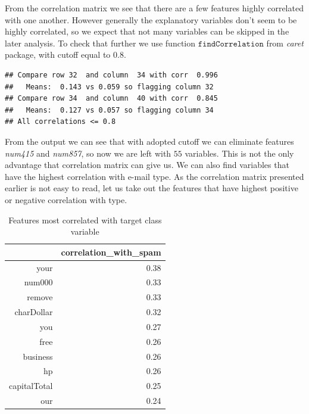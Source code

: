 \documentclass{article}\usepackage[]{graphicx}\usepackage[]{xcolor}
\makeatletter
\newenvironment{kframe}{%
 \def\at@end@of@kframe{}%
 \ifinner\ifhmode%
  \def\at@end@of@kframe{\end{minipage}}%
  \begin{minipage}{\columnwidth}%
 \fi\fi%
 \def\FrameCommand##1{\hskip\@totalleftmargin \hskip-\fboxsep
 \colorbox{shadecolor}{##1}\hskip-\fboxsep
     \hskip-\linewidth \hskip-\@totalleftmargin \hskip\columnwidth}%
 \MakeFramed {\advance\hsize-\width
   \@totalleftmargin\z@ \linewidth\hsize
   \@setminipage}}%
 {\par\unskip\endMakeFramed%
 \at@end@of@kframe}
\newenvironment{knitrout}{}{} %
\makeatother
\begin{document}
From the correlation matrix we see that there are a few features highly correlated 
with one another. However generally the explanatory variables don't seem to be highly correlated, 
so we expect that not many variables can be skipped in the later analysis. 
To check that further we use function $\texttt{findCorrelation}$ from \textit{caret} package, with cutoff equal to $0.8$.
\begin{knitrout}
\color{fgcolor}\begin{kframe}
\begin{verbatim}
## Compare row 32  and column  34 with corr  0.996 
##   Means:  0.143 vs 0.059 so flagging column 32 
## Compare row 34  and column  40 with corr  0.845 
##   Means:  0.127 vs 0.057 so flagging column 34 
## All correlations <= 0.8
\end{verbatim}
\end{kframe}
\end{knitrout}
From the output we can see that with adopted cutoff we can eliminate features \textit{num415} 
and \textit{num857}, so now we are left with $55$ variables. This is not the only advantage 
that correlation matrix can give us. We can also find variables that have the highest 
correlation with e-mail type. As the correlation matrix presented earlier is not easy to read, 
let us take out the features that have highest positive or negative correlation with type.



\begin{table}[ht]
\centering
\begin{tabular}{rr}
  \hline
 & correlation\_with\_spam \\ 
  \hline
your & 0.38 \\ 
  num000 & 0.33 \\ 
  remove & 0.33 \\ 
  charDollar & 0.32 \\ 
  you & 0.27 \\ 
  free & 0.26 \\ 
  business & 0.26 \\ 
  hp & 0.26 \\ 
  capitalTotal & 0.25 \\ 
  our & 0.24 \\ 
   \hline
\end{tabular}
\caption{Features most correlated with target class variable} 
\label{tab2}
\end{table}
\end{document}
